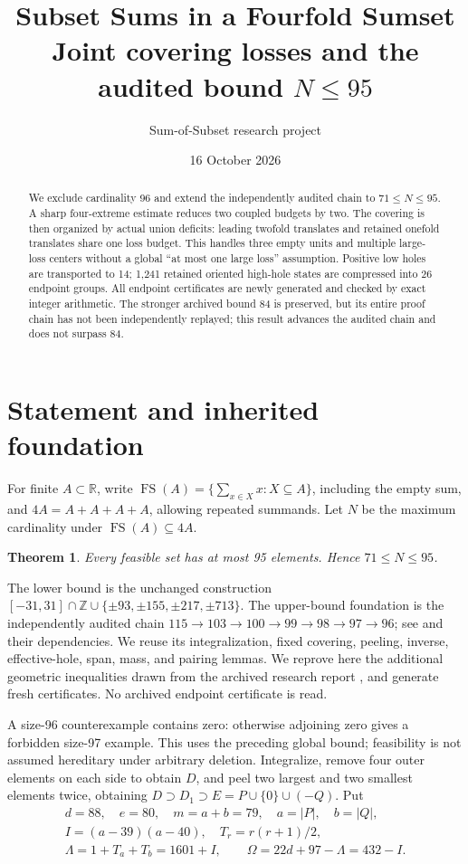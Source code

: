 \documentclass[11pt,a4paper]{article}
\title{Subset Sums in a Fourfold Sumset\\\large Joint covering losses and the audited bound $N\le95$}
\author{Sum-of-Subset research project}
\date{16 October 2026}
\newcommand{\FS}{\operatorname{FS}}
\newcommand{\Z}{\mathbb Z}
\newtheorem{theorem}{Theorem}[section]
\begin{document}
\maketitle
\begin{abstract}
We exclude cardinality 96 and extend the independently audited chain to
$71\le N\le95$. A sharp four-extreme estimate reduces two coupled
budgets by two. The covering is then organized by actual union deficits:
leading twofold translates and retained onefold translates share one
loss budget. This handles three empty units and multiple large-loss
centers without a global ``at most one large loss'' assumption.
Positive low holes are transported to 14; 1,241 retained oriented
high-hole states are compressed into 26 endpoint groups.
All endpoint certificates are newly generated and checked by exact
integer arithmetic. The stronger archived bound 84 is preserved, but
its entire proof chain has not been independently replayed; this result
advances the audited chain and does not surpass 84.
\end{abstract}

\section{Statement and inherited foundation}
For finite $A\subset\mathbb R$, write
$\FS(A)=\{\sum_{x\in X}x:X\subseteq A\}$, including the empty sum,
and $4A=A+A+A+A$, allowing repeated summands. Let $N$ be the maximum
cardinality under $\FS(A)\subseteq4A$.
\begin{theorem}
Every feasible set has at most 95 elements. Hence $71\le N\le95$.
\end{theorem}
The lower bound is the unchanged construction
$[-31,31]\cap\Z\cup\{\pm93,\pm155,\pm217,\pm713\}$.
The upper-bound foundation is the independently audited chain
$115\to103\to100\to99\to98\to97\to96$; see \cite{previous,method} and
their dependencies. We reuse its integralization, fixed covering,
peeling, inverse, effective-hole, span, mass, and pairing lemmas.
We reprove here the additional geometric inequalities drawn from the
archived research report \cite{archive}, and generate fresh certificates.
No archived endpoint certificate is read.

A size-96 counterexample contains zero: otherwise adjoining zero gives
a forbidden size-97 example. This uses the preceding global bound;
feasibility is not assumed hereditary under arbitrary deletion.
Integralize, remove four outer elements on each side to obtain $D$,
and peel two largest and two smallest elements twice, obtaining
$D\supset D_1\supset E=P\cup\{0\}\cup(-Q)$. Put
\begin{gather*}
 d=88,\quad e=80,\quad m=a+b=79,\quad a=|P|,\quad b=|Q|,\\
 I=(a-39)(a-40),\quad T_r=r(r+1)/2,\\
 \Lambda=1+T_a+T_b=1601+I,\qquad \Omega=22d+97-\Lambda=432-I.
\end{gather*}
\end{document}
